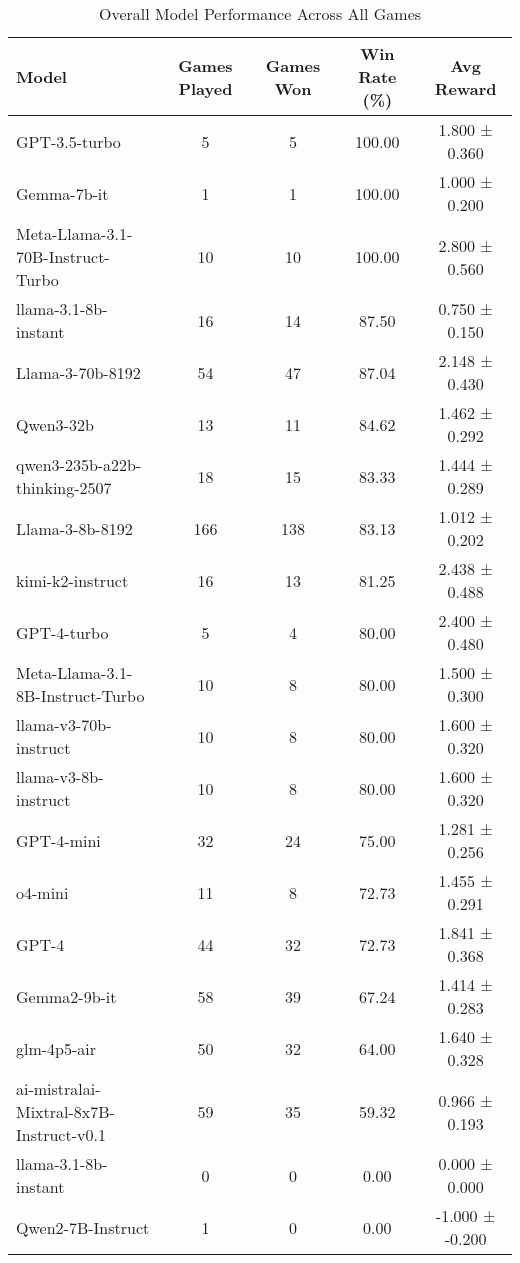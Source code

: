 \begin{table}[htbp]
\centering
\caption{Overall Model Performance Across All Games}
\begin{tabular}{lcccc}
\toprule
Model & Games Played & Games Won & Win Rate (\%) & Avg Reward \\
\midrule
GPT-3.5-turbo & 5 & 5 & 100.00 & 1.800 ± 0.360 \\
Gemma-7b-it & 1 & 1 & 100.00 & 1.000 ± 0.200 \\
Meta-Llama-3.1-70B-Instruct-Turbo & 10 & 10 & 100.00 & 2.800 ± 0.560 \\
llama-3.1-8b-instant & 16 & 14 & 87.50 & 0.750 ± 0.150 \\
Llama-3-70b-8192 & 54 & 47 & 87.04 & 2.148 ± 0.430 \\
Qwen3-32b & 13 & 11 & 84.62 & 1.462 ± 0.292 \\
qwen3-235b-a22b-thinking-2507 & 18 & 15 & 83.33 & 1.444 ± 0.289 \\
Llama-3-8b-8192 & 166 & 138 & 83.13 & 1.012 ± 0.202 \\
kimi-k2-instruct & 16 & 13 & 81.25 & 2.438 ± 0.488 \\
GPT-4-turbo & 5 & 4 & 80.00 & 2.400 ± 0.480 \\
Meta-Llama-3.1-8B-Instruct-Turbo & 10 & 8 & 80.00 & 1.500 ± 0.300 \\
llama-v3-70b-instruct & 10 & 8 & 80.00 & 1.600 ± 0.320 \\
llama-v3-8b-instruct & 10 & 8 & 80.00 & 1.600 ± 0.320 \\
GPT-4-mini & 32 & 24 & 75.00 & 1.281 ± 0.256 \\
o4-mini & 11 & 8 & 72.73 & 1.455 ± 0.291 \\
GPT-4 & 44 & 32 & 72.73 & 1.841 ± 0.368 \\
Gemma2-9b-it & 58 & 39 & 67.24 & 1.414 ± 0.283 \\
glm-4p5-air & 50 & 32 & 64.00 & 1.640 ± 0.328 \\
ai-mistralai-Mixtral-8x7B-Instruct-v0.1 & 59 & 35 & 59.32 & 0.966 ± 0.193 \\
llama-3.1-8b-instant & 0 & 0 & 0.00 & 0.000 ± 0.000 \\
Qwen2-7B-Instruct & 1 & 0 & 0.00 & -1.000 ± -0.200 \\
\bottomrule
\end{tabular}
\end{table}
